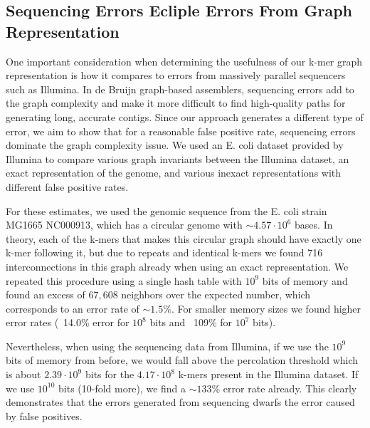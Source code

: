 \documentclass[12pt]{article} \usepackage{simplemargins}
\begin{document}
\subsection{Sequencing Errors Ecliple Errors From Graph Representation}
One important consideration when determining the usefulness of our k-mer
graph representation is how it compares to errors from massively
parallel sequencers such as Illumina. In de Bruijn graph-based
assemblers, sequencing errors add to the graph complexity and make it
more difficult to find high-quality paths for generating long,
accurate contigs. Since our approach generates
a different type of error, we aim to show that for a reasonable false
positive rate, sequencing errors dominate the graph complexity
issue. We used an E. coli dataset provided by Illumina to compare
various graph invariants between the Illumina dataset, an exact
representation of the genome, and various inexact representations with
different false positive rates.

For these estimates, we used the genomic sequence from the E. coli strain 
MG1665 NC000913, which has a circular genome with $\sim 4.57 \cdot 10^6$ bases. 
In theory, each of the k-mers that makes this
circular graph should have exactly one k-mer following it, but due to 
repeats and identical k-mers we found 716 interconnections in this graph 
already when using an exact representation. We repeated this procedure 
using a single hash table with $10^9$ bits of memory and found an excess of 
$67,608$ neighbors over the expected number, which corresponds to an error rate of 
$\sim 1.5\%$. For smaller memory 
sizes we found higher error rates (~14.0\% error for $10^8$ bits and 
~109\% for $10^7$ bits).

Nevertheless, when using 
the sequencing data from Illumina, if we use the $10^9$ bits of memory 
from before, we would fall above the percolation threshold which is 
about $2.39 \cdot 10^9$ bits for the 
$4.17 \cdot 10^8$ k-mers present in the Illumina dataset. 
If we use $10^{10}$ bits (10-fold more), we find a $\sim 133\%$ 
error rate already. This clearly demonstrates that
the errors generated from sequencing dwarfs the error caused by false positives.
\end{document}

